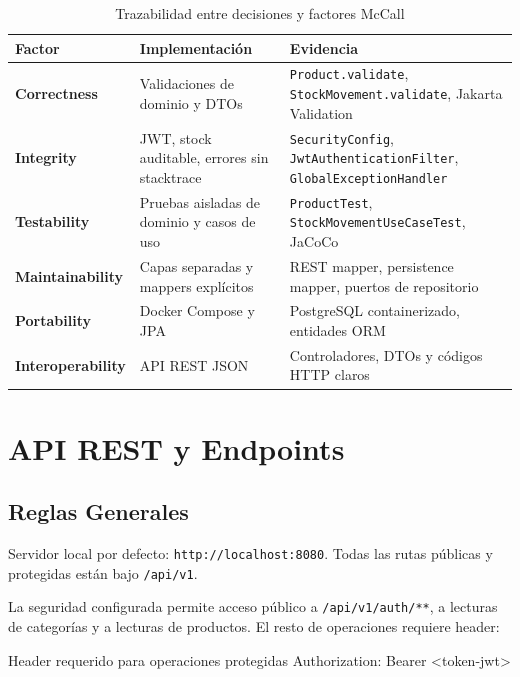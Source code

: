 \documentclass[11pt,oneside]{report}
\begin{document}
\begin{table}[h!]
\centering
\caption{Trazabilidad entre decisiones y factores McCall}
\begin{tabularx}{\textwidth}{>{\bfseries}p{3.2cm} X X}
\toprule
Factor & Implementación & Evidencia \\
\midrule
Correctness & Validaciones de dominio y DTOs & \texttt{Product.validate}, \texttt{StockMovement.validate}, Jakarta Validation\\
Integrity & JWT, stock auditable, errores sin stacktrace & \texttt{SecurityConfig}, \texttt{JwtAuthenticationFilter}, \texttt{GlobalExceptionHandler}\\
Testability & Pruebas aisladas de dominio y casos de uso & \texttt{ProductTest}, \texttt{StockMovementUseCaseTest}, JaCoCo\\
Maintainability & Capas separadas y mappers explícitos & REST mapper, persistence mapper, puertos de repositorio\\
Portability & Docker Compose y JPA & PostgreSQL containerizado, entidades ORM\\
Interoperability & API REST JSON & Controladores, DTOs y códigos HTTP claros\\
\bottomrule
\end{tabularx}
\end{table}

\chapter{API REST y Endpoints}

\section{Reglas Generales}

\begin{infobox}
Servidor local por defecto: \texttt{http://localhost:8080}. Todas las rutas públicas y protegidas están bajo \texttt{/api/v1}.
\end{infobox}

La seguridad configurada permite acceso público a \texttt{/api/v1/auth/**}, a lecturas de categorías y a lecturas de productos. El resto de operaciones requiere header:

\begin{codewindow}[language=Text]{Header requerido para operaciones protegidas}
Authorization: Bearer <token-jwt>
\end{codewindow}
\end{document}
